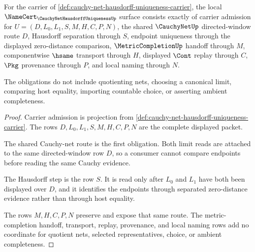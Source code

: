 \begin{theorem}
\label{thm:cauchy-net-hausdorff-uniqueness-namecert-obligations}
For the carrier of \autoref{def:cauchy-net-hausdorff-uniqueness-carrier}, the local $\NameCert_{\CauchyNetHausdorffUniquenessUp}$ surface consists exactly of carrier admission for $U=(D,L_0,L_1,S,M,H,C,P,N)$, the shared $\CauchyNetUp$ directed-window route $D$, Hausdorff separation through $S$, endpoint uniqueness through the displayed zero-distance comparison, $\MetricCompletionUp$ handoff through $M$, componentwise $\hsame$ transport through $H$, displayed $\Cont$ replay through $C$, $\Pkg$ provenance through $P$, and local naming through $N$.

The obligations do not include quotienting nets, choosing a canonical limit, comparing host equality, importing countable choice, or asserting ambient completeness.
\end{theorem}
\begin{proof}
Carrier admission is projection from \autoref{def:cauchy-net-hausdorff-uniqueness-carrier}. The rows $D,L_0,L_1,S,M,H,C,P,N$ are the complete displayed packet.

The shared Cauchy-net route is the first obligation. Both limit reads are attached to the same directed-window row $D$, so a consumer cannot compare endpoints before reading the same Cauchy evidence.

The Hausdorff step is the row $S$. It is read only after $L_0$ and $L_1$ have both been displayed over $D$, and it identifies the endpoints through separated zero-distance evidence rather than through host equality.

The rows $M,H,C,P,N$ preserve and expose that same route. The metric-completion handoff, transport, replay, provenance, and local naming rows add no coordinate for quotient nets, selected representatives, choice, or ambient completeness.
\end{proof}

